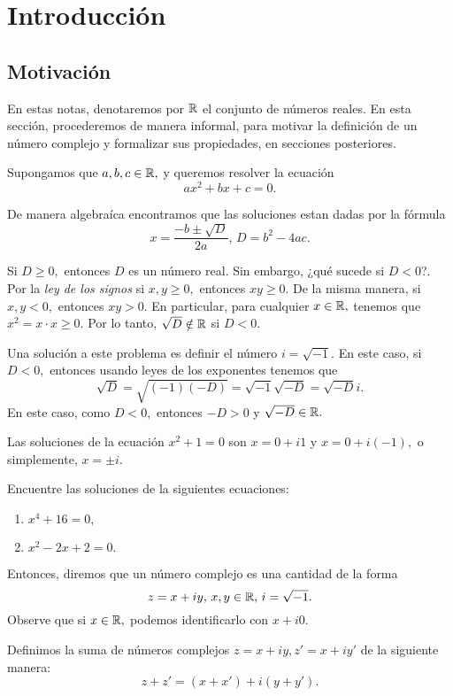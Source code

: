 \section{Introducción}

\subsection*{Motivación}
En estas notas, denotaremos por $\mathbb{R}$ el conjunto de números reales. En esta sección, procederemos de manera informal,
para motivar la definición de un número complejo y formalizar sus propiedades, en secciones posteriores. 


Supongamos que $a,b,c\in \mathbb{R},$ y queremos resolver
la ecuación
$$
ax^2+bx+c=0.
$$

De manera algebraíca encontramos que las soluciones estan dadas por la fórmula
$$
x=\dfrac{-b\pm \sqrt{D}}{2a}, \, D=b^2-4ac.
$$

Si $D \geq 0,$ entonces $D$ es un número real. Sin embargo, ¿qué sucede si $D<0$?. Por la \emph{ley de los signos} si
$x,y\geq 0,$ entonces $xy\geq 0.$ De la misma manera, si $x,y<0,$ entonces $xy>0.$ En particular, para cualquier
$x\in \mathbb{R},$ tenemos que $x^{2}=x\cdot x\geq 0.$ Por lo tanto, $\sqrt{D} \notin \mathbb{R}$ si $D<0.$

Una solución a este problema es definir el número $i=\sqrt{-1}.$ En este caso, si $D<0,$ entonces usando leyes de los
exponentes tenemos que
$$
\sqrt{D}=\sqrt{(-1)(-D)}=\sqrt{-1}\sqrt{-D}=\sqrt{-D}i.
$$
En este caso, como $D<0,$ entonces $-D>0$ y $\sqrt{-D}\in \mathbb{R}.$

\begin{problema}
 Las soluciones de la ecuación $x^2+1=0$ son $x=0+i1$ y $x=0+i(-1),$ o simplemente, $x=\pm i.$
\end{problema}

\begin{problema}
 Encuentre las soluciones de la siguientes ecuaciones:
 \begin{enumerate}
  \item $x^{4}+16=0,$
  \item $x^{2}-2x+2=0.$
 \end{enumerate}

\end{problema}


 Entonces, diremos que un número complejo es una cantidad de la forma
 $$
z=x+iy, \, x,y\in \mathbb{R}, \, i=\sqrt{-1}.
 $$
 Observe que si $x\in \mathbb{R},$ podemos identificarlo con $x+i0.$

Definimos la suma de números complejos $z=x+iy,z'=x+iy'$ de la siguiente manera:
$$
z+z'=(x+x')+i(y+y').
$$

